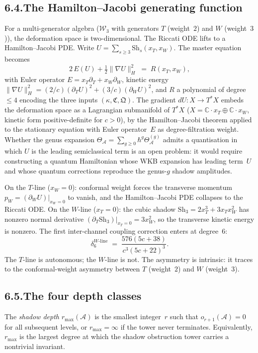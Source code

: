 \documentclass[11pt]{report}
\theoremstyle{definition}
\theoremstyle{remark}
\providecommand{\cA}{\mathcal{A}}
\providecommand{\bC}{\mathbb{C}}
\numberwithin{equation}{section}
\begin{document}
\subsection*{6.4.\enspace The Hamilton--Jacobi generating function}

For a multi-generator algebra ($\mathcal{W}_3$ with
generators $T$ (weight~$2$) and $W$ (weight~$3$)), the
deformation space is two-dimensional. The Riccati ODE lifts
to a Hamilton--Jacobi PDE. Write
$U=\sum_{s\ge 3}\mathrm{Sh}_s(x_T,x_W)$. The master equation
becomes
\[
2\,E(U)+\tfrac{1}{2}\lVert\nabla U\rVert^2_H
\;=\;R(x_T,x_W),
\]
with Euler operator $E=x_T\partial_T+x_W\partial_W$,
kinetic energy
$\lVert\nabla U\rVert^2_H
=(2/c)(\partial_T U)^2+(3/c)(\partial_W U)^2$,
and $R$ a polynomial of degree~$\le 4$ encoding the
three inputs $(\kappa,\mathfrak{C},\mathfrak{Q})$.
The gradient
$dU\colon X\to T^*X$ embeds the deformation space as a
Lagrangian submanifold of $T^*X$
($X = \bC\cdot x_T\oplus\bC\cdot x_W$,
kinetic form positive-definite for $c>0$),
by the Hamilton--Jacobi theorem applied to the stationary
equation with Euler operator~$E$ as
degree-filtration weight. Whether the genus expansion
$\Theta_\cA = \sum_{g \geq 0}\hbar^g\Theta_\cA^{(g)}$
admits a quantisation in which $U$ is the leading
semiclassical term is an open problem: it would require
constructing a quantum Hamiltonian whose WKB expansion
has leading term~$U$ and whose quantum corrections
reproduce the genus-$g$ shadow amplitudes.

On the $T$-line ($x_W=0$): conformal weight forces the
transverse momentum $p_W=(\partial_W U)|_{x_W=0}$ to vanish,
and the Hamilton--Jacobi PDE collapses to the Riccati ODE.
On the $W$-line ($x_T=0$): the cubic shadow
$\mathrm{Sh}_3 = 2x_T^3 + 3x_T x_W^2$
has nonzero normal derivative
$(\partial_T\mathrm{Sh}_3)|_{x_T=0}=3x_W^2$,
so the transverse kinetic energy is nonzero. The first
inter-channel coupling correction enters at degree~$6$:
\[
\delta_6^{W\text{-line}}
\;=\;
\frac{576(5c+38)}{c^3(5c+22)^3}.
\]
The $T$-line is autonomous; the $W$-line is not. The
asymmetry is intrinsic: it traces to the conformal-weight
asymmetry between $T$ (weight~$2$) and $W$ (weight~$3$).

\subsection*{6.5.\enspace The four depth classes}

The \emph{shadow depth} $r_{\max}(\cA)$ is the smallest integer~$r$
such that $o_{r+1}(\cA)=0$ for all subsequent levels, or
$r_{\max}=\infty$ if the tower never terminates. Equivalently,
$r_{\max}$ is the largest degree at which the shadow obstruction tower carries a
nontrivial invariant.
\end{document}
